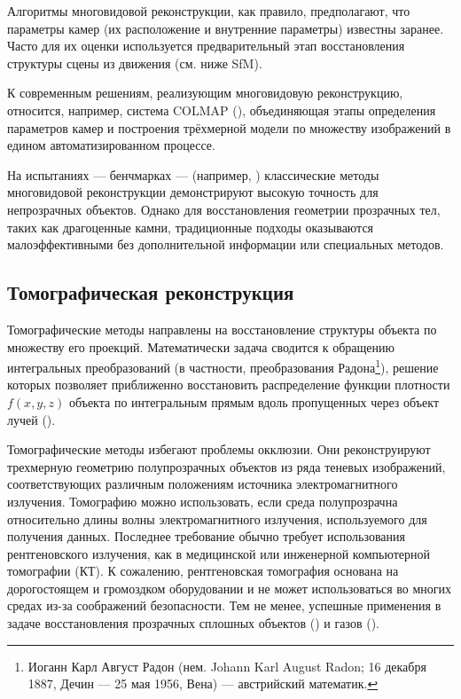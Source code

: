 Алгоритмы многовидовой реконструкции, как правило, предполагают, что параметры
камер (их расположение и внутренние параметры) известны заранее. Часто для их
оценки используется предварительный этап восстановления структуры сцены из
движения (см. ниже SfM).

К современным решениям, реализующим многовидовую реконструкцию,
относится, например, система COLMAP (\cite{schoenberger2016mvs}), объединяющая этапы определения параметров
камер и построения трёхмерной модели по множеству изображений в едином
автоматизированном процессе.

На испытаниях — бенчмарках — (например, \cite{Knapitsch2017}) классические методы многовидовой
реконструкции демонстрируют высокую точность для непрозрачных объектов. Однако
для восстановления геометрии прозрачных тел, таких как драгоценные камни,
традиционные подходы оказываются малоэффективными без дополнительной информации
или специальных методов.

\subsection{Томографическая реконструкция}

Томографические методы направлены на восстановление структуры объекта
по множеству его проекций. Математически задача сводится к
обращению интегральных преобразований (в частности, преобразования
Радона\footnote{ Иоганн Карл Август Радон (нем. Johann Karl August Radon; 16
декабря 1887, Дечин — 25 мая 1956, Вена) — австрийский математик.  }), решение
которых позволяет приближенно восстановить распределение функции плотности $f(x,y,z)$ объекта
по интегральным прямым вдоль пропущенных через объект лучей (\cite{book:869357}).

Томографические методы избегают проблемы окклюзии. Они реконструируют трехмерную
геометрию полупрозрачных объектов из ряда теневых изображений, соответствующих
различным положениям источника электромагнитного излучения. Томографию можно
использовать, если среда полупрозрачна относительно длины волны электромагнитного
излучения, используемого для получения данных.  Последнее требование обычно
требует использования рентгеновского излучения, как в медицинской или инженерной
компьютерной томографии (КТ). К сожалению, рентгеновская томография основана на
дорогостоящем и громоздком оборудовании и не может использоваться во многих
средах из-за соображений безопасности. Тем не менее, успешные применения
в задаче восстановления прозрачных сплошных объектов (\cite{10.1145/1179849.1179918}) и
газов (\cite{IHRKE2006484}).

